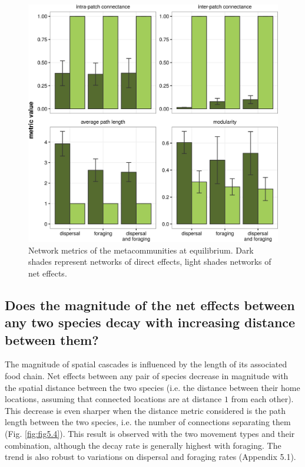 \begin{figure}[ht]
\includegraphics[width=.7\textwidth,height=\textheight,keepaspectratio]{./Figures/chapter05/Fig_3.png}
\centering
\caption[Metacommunity network metrics]{\color{Gray}Network metrics of the metacommunities at equilibrium. Dark shades represent networks of direct effects, light shades networks of net effects.}\label{fig:fig5.3}
\end{figure}

\FloatBarrier

\subsection*{Does the magnitude of the net effects between any two species decay with increasing distance between them?}

The magnitude of spatial cascades is influenced by the length of its associated food chain. Net effects between any pair of species decrease in magnitude with the spatial distance between the two species (i.e. the distance between their home locations, assuming that connected locations are at distance $1$ from each other). This decrease is even sharper when the distance metric considered is the path length between the two species, i.e. the number of connections separating them (Fig. \ref{fig:fig5.4}). This result is observed with the two movement types and their combination, although the decay rate is generally highest with foraging. The trend is also robust to variations on dispersal and foraging rates (Appendix 5.1).

